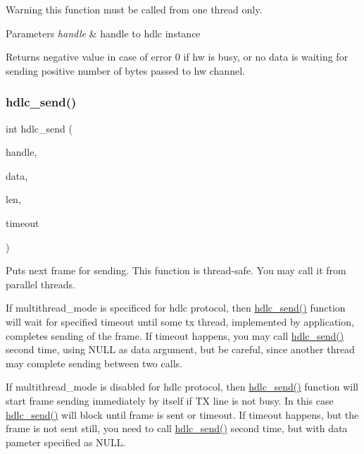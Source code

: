 \begin{DoxyWarning}{Warning}
this function must be called from one thread only.
\end{DoxyWarning}

\begin{DoxyParams}{Parameters}
{\em handle} & handle to hdlc instance \\
\hline
\end{DoxyParams}
\begin{DoxyReturn}{Returns}
negative value in case of error 0 if hw is busy, or no data is waiting for sending positive number of bytes passed to hw channel. 
\end{DoxyReturn}
\mbox{\label{group__HDLC__API_ga8b5cc456927145cebd82b2b560a6fa10}} 
\subsubsection{\texorpdfstring{hdlc\+\_\+send()}{hdlc\_send()}}
{\footnotesize\ttfamily int hdlc\+\_\+send (\begin{DoxyParamCaption}\item[{\hyperlink{group__HDLC__API_gabeaf7578aed5279d3af891bd85a9f961}{hdlc\+\_\+handle\+\_\+t}}]{handle,  }\item[{const void $\ast$}]{data,  }\item[{int}]{len,  }\item[{uint32\+\_\+t}]{timeout }\end{DoxyParamCaption})}

Puts next frame for sending. This function is thread-\/safe. You may call it from parallel threads.

If multithread\+\_\+mode is specificed for hdlc protocol, then \hyperlink{group__HDLC__API_ga8b5cc456927145cebd82b2b560a6fa10}{hdlc\+\_\+send()} function will wait for specified timeout until some tx thread, implemented by application, completes sending of the frame. If timeout happens, you may call \hyperlink{group__HDLC__API_ga8b5cc456927145cebd82b2b560a6fa10}{hdlc\+\_\+send()} second time, using N\+U\+LL as data argument, but be careful, since another thread may complete sending between two calls.

If multithread\+\_\+mode is disabled for hdlc protocol, then \hyperlink{group__HDLC__API_ga8b5cc456927145cebd82b2b560a6fa10}{hdlc\+\_\+send()} function will start frame sending immediately by itself if TX line is not busy. In this case \hyperlink{group__HDLC__API_ga8b5cc456927145cebd82b2b560a6fa10}{hdlc\+\_\+send()} will block until frame is sent or timeout. If timeout happens, but the frame is not sent still, you need to call \hyperlink{group__HDLC__API_ga8b5cc456927145cebd82b2b560a6fa10}{hdlc\+\_\+send()} second time, but with data pameter specified as N\+U\+LL.

